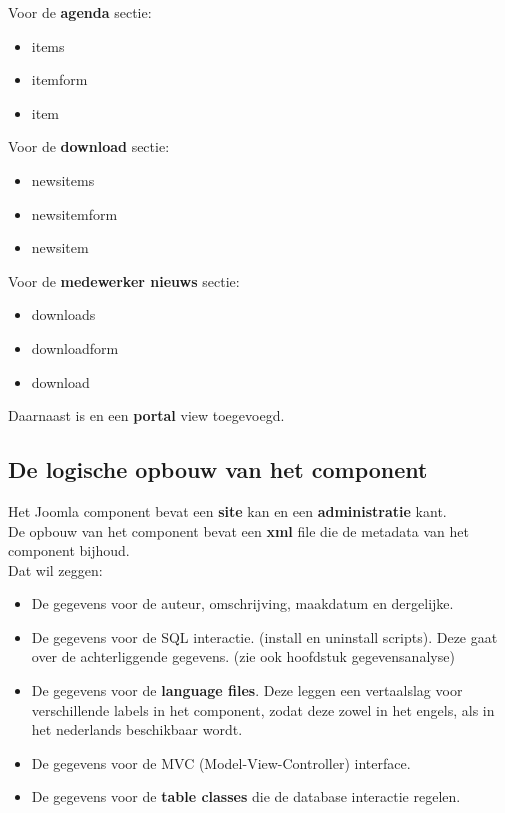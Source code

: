 \documentclass{article}
\begin{document}
Voor de \textbf{agenda} sectie: \\

\begin{itemize}
\item items
\item itemform
\item item
\end{itemize}

Voor de \textbf{download} sectie: \\

\begin{itemize}
\item newsitems
\item newsitemform
\item newsitem
\end{itemize}

Voor de \textbf{medewerker nieuws} sectie: \\

\begin{itemize}
\item downloads
\item downloadform
\item download
\end{itemize}


Daarnaast is en een \textbf{portal} view toegevoegd.

\subsection{De logische opbouw van het component}

Het Joomla component bevat een \textbf{site} kan en een \textbf{administratie} kant. \\
De opbouw van het component bevat een \textbf{xml} file die de metadata van het component bijhoud. \\
Dat wil zeggen: \\
\begin{itemize}
\item De gegevens voor de auteur, omschrijving, maakdatum en dergelijke. \\
\item De gegevens voor de SQL interactie. (install en uninstall scripts). Deze gaat over de achterliggende gegevens. (zie ook hoofdstuk gegevensanalyse)  \\
\item De gegevens voor de \textbf{language files}. Deze leggen een vertaalslag voor verschillende labels in het component, zodat deze zowel in het engels, als in het nederlands beschikbaar wordt.
\item De gegevens voor de MVC (Model-View-Controller) interface.\\
\item De gegevens voor de \textbf{table classes} die de database interactie regelen. \\
\end{itemize}
\end{document}

